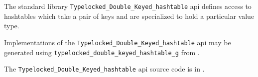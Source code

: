 
The standard library {\tt Typelocked\_Double\_Keyed\_hashtable} api defines access to hashtables 
which take a pair of keys and are specialized to hold a particular value type.

Implementations of the {\tt Typelocked\_Double\_Keyed\_hashtable} api 
may be generated using {\tt typelocked\_double\_keyed\_hashtable\_g} from 
.

The {\tt Typelocked\_Double\_Keyed\_hashtable} api source code is in .
